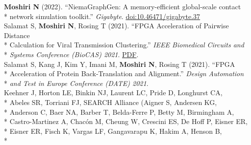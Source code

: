 \documentclass[margin,line]{res}
\begin{document}
\begin{resume}
\hspace*{4mm} \textbf{Moshiri N} (2022). ``NiemaGraphGen: A memory-efficient global-scale contact\\*\vspace{2mm}
\hspace*{8mm} network simulation toolkit.'' \textit{Gigabyte}. \href{https://doi.org/10.46471/gigabyte.37}{doi:10.46471/gigabyte.37}\\
\hspace*{4mm} Salamat S, \textbf{Moshiri N}, Rosing T (2021). ``FPGA Acceleration of Pairwise Distance\\*
\hspace*{9.5mm} Calculation for Viral Transmission Clustering.'' \textit{IEEE Biomedical Circuits and}\\*\vspace{2mm}
\hspace*{8mm} \textit{Systems Conference (BioCAS) 2021}. \href{https://par.nsf.gov/servlets/purl/10323850}{PDF}.\\
\hspace*{4mm} Salamat S, Kang J, Kim Y, Imani M, \textbf{Moshiri N}, Rosing T (2021). ``FPGA\\*
\hspace*{9.5mm} Acceleration of Protein Back-Translation and Alignment.'' \textit{Design Automation}\\*\vspace{2mm}
\hspace*{8mm} \textit{and Test in Europe Conference (DATE) 2021}.\\
\hspace*{4mm} Keehner J, Horton LE, Binkin NJ, Laurent LC, Pride D, Longhurst CA,\\*
\hspace*{9.5mm} Abeles SR, Torriani FJ, SEARCH Alliance (Aigner S, Andersen KG,\\*
\hspace*{9.5mm} Anderson C, Baer NA, Barber T, Belda-Ferre P, Betty M, Birmingham A,\\*
\hspace*{9.5mm} Castro-Martinez A, Chac\'on M, Cheung W, Crescini ES, De Hoff P, Eisner ER,\\*
\hspace*{9.5mm} Eisner ER, Fisch K, Vargas LF, Gangavarapu K, Hakim A, Henson B,\\*

\end{resume}
\end{document}
